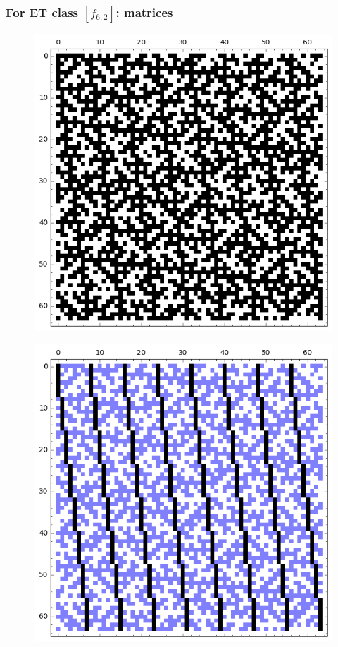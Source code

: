 \documentclass[pdf,sprung,slideColor,nocolorBG]{beamer}
\begin{document}
\begin{frame}
\frametitle{For ET class $[f_{6,2}]$: matrices}
\begin{figure}
\centering
\begin{minipage}{.48\textwidth}
  \centering
  \includegraphics[width=.9\linewidth]{../matrix_plot/c6_2_weight_class_matrix.png}
  \label{fig:6_2_weight_class_matrix}
\end{minipage}%
\begin{minipage}{.48\textwidth}
  \centering
  \includegraphics[width=.9\linewidth]{../matrix_plot/c6_2_bent_cayley_graph_index_matrix.png}
  \label{fig:6_2_bent_cayley_graph_index_matrix}
\end{minipage}
\end{figure}
\end{frame}
\end{document}
